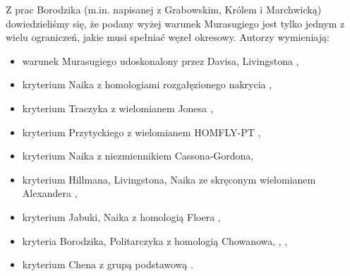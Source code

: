 Z prac Borodzika (m.in. \cite{grabowski20} napisanej z Grabowskim, Królem i Marchwicką) dowiedzieliśmy się, że podany wyżej warunek Murasugiego jest tylko jednym z wielu ograniczeń, jakie musi spełniać węzeł okresowy.
Autorzy wymieniają:
\begin{itemize}
    \item warunek Murasugiego udoskonalony przez Davisa, Livingstona \cite{davis1991},
%
%
    \item kryterium Naika z homologiami rozgałęzionego nakrycia \cite{naik1997},
%
%
%
    \item kryterium Traczyka z wielomianem Jonesa \cite{traczyk1991},
%
%
    \item kryterium Przytyckiego z wielomianem HOMFLY-PT \cite{przytyckij1989},
%
%
    \item kryterium Naika z niezmiennikiem Cassona-Gordona,
%
%
    \item kryterium Hillmana, Livingstona, Naika ze skręconym wielomianem Alexandera \cite{hillman2006},
%
%
%
%
    \item kryterium Jabuki, Naika z homologią Floera \cite{jabuka2016},
%
%
%
    \item kryteria Borodzika, Politarczyka z homologią Chowanowa, \cite{politarczyk2017}, \cite{politarczyk2021},
%
%
%
    \item kryterium Chena z grupą podstawową \cite{chen2018}.
%
%
\end{itemize}
%

%


